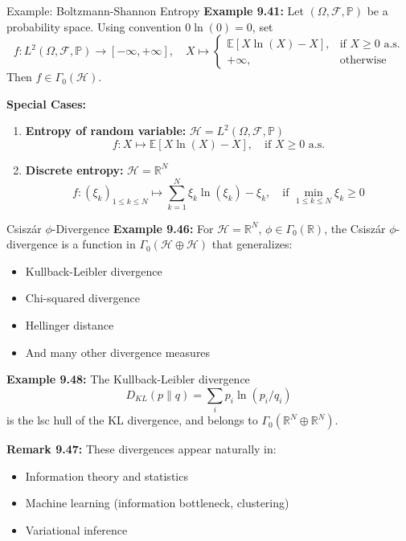 \documentclass[aspectratio=169,10pt]{beamer}
\begin{document}
\begin{frame}{Example: Boltzmann-Shannon Entropy}
\textbf{Example 9.41:} Let $(\Omega, \mathcal{F}, \mathbb{P})$ be a probability space. Using convention $0 \ln(0) = 0$, set
\[
f: L^2(\Omega, \mathcal{F}, \mathbb{P}) \to [-\infty, +\infty], \quad X \mapsto \begin{cases}
\mathbb{E}[X \ln(X) - X], & \text{if } X \geq 0 \text{ a.s.} \\
+\infty, & \text{otherwise}
\end{cases}
\]
Then $f \in \Gamma_0(\mathcal{H})$.

\textbf{Special Cases:}
\begin{enumerate}
    \item \textbf{Entropy of random variable:} $\mathcal{H} = L^2(\Omega, \mathcal{F}, \mathbb{P})$
        \[
        f: X \mapsto \mathbb{E}[X \ln(X) - X], \quad \text{if } X \geq 0 \text{ a.s.}
        \]
    \item \textbf{Discrete entropy:} $\mathcal{H} = \mathbb{R}^N$
        \[
        f: (\xi_k)_{1 \leq k \leq N} \mapsto \sum_{k=1}^N \xi_k \ln(\xi_k) - \xi_k, \quad \text{if } \min_{1 \leq k \leq N} \xi_k \geq 0
        \]
\end{enumerate}
\end{frame}

\begin{frame}{Csiszár $\phi$-Divergence}
\textbf{Example 9.46:} For $\mathcal{H} = \mathbb{R}^N$, $\phi \in \Gamma_0(\mathbb{R})$, the \alert{Csiszár $\phi$-divergence} is a function in $\Gamma_0(\mathcal{H} \oplus \mathcal{H})$ that generalizes:
\begin{itemize}
    \item Kullback-Leibler divergence
    \item Chi-squared divergence
    \item Hellinger distance
    \item And many other divergence measures
\end{itemize}

\vspace{0.3cm}
\textbf{Example 9.48:} The \alert{Kullback-Leibler divergence} 
\[
D_{KL}(p \| q) = \sum_i p_i \ln(p_i / q_i)
\]
is the lsc hull of the KL divergence, and belongs to $\Gamma_0(\mathbb{R}^N \oplus \mathbb{R}^N)$.

\vspace{0.3cm}
\textbf{Remark 9.47:} These divergences appear naturally in:
\begin{itemize}
    \item Information theory and statistics
    \item Machine learning (information bottleneck, clustering)
    \item Variational inference
\end{itemize}
\end{frame}
\end{document}
